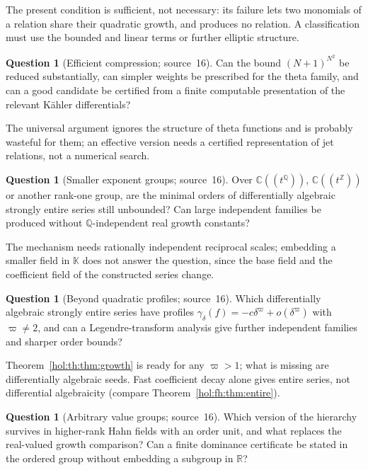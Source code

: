 \documentclass[11pt]{article}
\numberwithin{equation}{section}
\theoremstyle{definition}
\newtheorem{question}[theorem]{Question}
\theoremstyle{remark}
\newcommand{\C}{\mathbb C}
\newcommand{\R}{\mathbb R}
\newcommand{\Q}{\mathbb Q}
\newcommand{\Z}{\mathbb Z}
\newcommand{\KK}{\mathbb K}
\begin{document}
The present condition is sufficient, not necessary: its failure lets two
monomials of a relation share their quadratic growth, and produces no
relation. A classification must use the bounded and linear terms or further
elliptic structure.

\begin{question}[Efficient compression; source~16]\label{hol:th:q:compression}
Can the bound $(N+1)^{N^2}$ be reduced substantially, can simpler weights be
prescribed for the theta family, and can a good candidate be certified from a
finite computable presentation of the relevant K\"ahler differentials?
\end{question}

The universal argument ignores the structure of theta functions and is
probably wasteful for them; an effective version needs a certified
representation of jet relations, not a numerical search.

\begin{question}[Smaller exponent groups; source~16]\label{hol:th:q:smaller}
Over $\C((t^\Q))$, $\C((t^\Z))$ or another rank-one group, are the minimal
orders of differentially algebraic strongly entire series still unbounded?
Can large independent families be produced without $\Q$-independent real
growth constants?
\end{question}

The mechanism needs rationally independent reciprocal scales; embedding a
smaller field in $\KK$ does not answer the question, since the base field and
the coefficient field of the constructed series change.

\begin{question}[Beyond quadratic profiles; source~16]\label{hol:th:q:profiles}
Which differentially algebraic strongly entire series have profiles
$\gamma_\delta(f)=-c\delta^\varpi+o(\delta^\varpi)$ with $\varpi\ne2$, and can a
Legendre-transform analysis give further independent families and sharper
order bounds?
\end{question}

Theorem~\ref{hol:th:thm:growth} is ready for any $\varpi>1$; what is missing
are differentially algebraic seeds. Fast coefficient decay alone gives entire
series, not differential algebraicity (compare
Theorem~\ref{hol:fh:thm:entire}).

\begin{question}[Arbitrary value groups; source~16]\label{hol:th:q:groups}
Which version of the hierarchy survives in higher-rank Hahn fields with an
order unit, and what replaces the real-valued growth comparison? Can a
finite dominance certificate be stated in the ordered group without embedding
a subgroup in $\R$?
\end{question}
\end{document}
